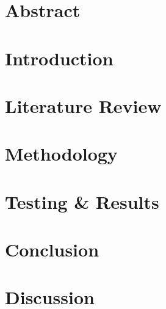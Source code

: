 \documentclass[12pt]{report}
\begin{document}

\newpage
\pagestyle{plain}

\newpage
%

\newpage
\chapter*{Abstract}
\label{Abstract Chapter}


\newpage
\tableofcontents
\newpage
\listoffigures
{}
\newpage
\pagestyle{fancy}

\chapter{Introduction}
\label{Introduction Chapter}


\chapter{Literature Review}
\label{Literature Review Chapter}


\chapter{Methodology}
\label{Methodology Chapter}


\chapter{Testing \& Results}
\label{Testing & Results Chapter}


\chapter{Conclusion}
\label{Conclusion Chapter}


\chapter{Discussion}
\label{Discussion Chapter}

\end{document}
